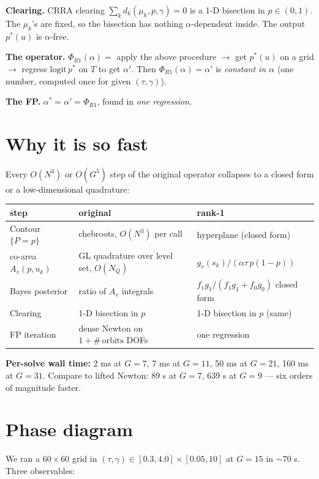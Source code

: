 \documentclass[11pt]{article}
\begin{document}
\textbf{Clearing.} CRRA clearing $\sum_k d_k(\mu_k, p, \gamma) = 0$ is a 1-D bisection in
$p\in(0,1)$. The $\mu_k$'s are fixed, so the bisection has nothing $\alpha$-dependent
inside. The output $p^*(u)$ is $\alpha$-free.

\textbf{The operator.} $\Phi_{R1}(\alpha) = $ apply the above procedure $\to$ get $p^*(u)$
on a grid $\to$ regress $\mathrm{logit}\,p^*$ on $T$ to get $\alpha'$. Then
$\Phi_{R1}(\alpha) = \alpha'$ is \emph{constant in $\alpha$} (one number, computed once
for given $(\tau, \gamma)$).

\textbf{The FP.} $\alpha^* = \alpha' = \Phi_{R1}$, found in \emph{one regression}.

\section{Why it is so fast}

Every $O(N^3)$ or $O(G^5)$ step of the original operator collapses to a closed form or
a low-dimensional quadrature:

\begin{center}\begin{tabular}{lll}\toprule
\textbf{step} & \textbf{original} & \textbf{rank-1} \\\midrule
Contour $\{P=p\}$ & chebroots, $O(N^3)$ per call & hyperplane (closed form) \\
co-area $A_v(p, u_k)$ & GL quadrature over level set, $O(N_Q)$ & $g_v(s_k)/(\alpha\tau\,p(1-p))$ \\
Bayes posterior & ratio of $A_v$ integrals & $f_1g_1/(f_1g_1+f_0g_0)$ closed form \\
Clearing & 1-D bisection in $p$ & 1-D bisection in $p$ (same) \\
FP iteration & dense Newton on $1+\#\,\mathrm{orbits}$ DOFs & one regression \\
\bottomrule\end{tabular}\end{center}

\textbf{Per-solve wall time:} 2 ms at $G=7$, 7 ms at $G=11$, 50 ms at $G=21$,
160 ms at $G=31$. Compare to lifted Newton: 89 s at $G=7$, 639 s at $G=9$ — six orders
of magnitude faster.

\section{Phase diagram}\label{sec:phasemap}

We ran a $60\times 60$ grid in $(\tau, \gamma)\in[0.3, 4.0]\times[0.05, 10]$ at $G=15$
in $\sim 70$ s. Three observables:
\end{document}
